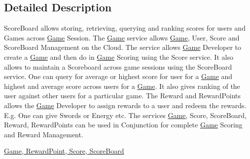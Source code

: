 \subsection{Detailed Description}
Score\+Board allows storing, retrieving, querying and ranking scores for users and Games across \hyperlink{classcom_1_1shephertz_1_1app42_1_1paas_1_1sdk_1_1csharp_1_1game_1_1_game}{Game} Session. The \hyperlink{classcom_1_1shephertz_1_1app42_1_1paas_1_1sdk_1_1csharp_1_1game_1_1_game}{Game} service allows \hyperlink{classcom_1_1shephertz_1_1app42_1_1paas_1_1sdk_1_1csharp_1_1game_1_1_game}{Game}, User, Score and Score\+Board Management on the Cloud. The service allows \hyperlink{classcom_1_1shephertz_1_1app42_1_1paas_1_1sdk_1_1csharp_1_1game_1_1_game}{Game} Developer to create a \hyperlink{classcom_1_1shephertz_1_1app42_1_1paas_1_1sdk_1_1csharp_1_1game_1_1_game}{Game} and then do in \hyperlink{classcom_1_1shephertz_1_1app42_1_1paas_1_1sdk_1_1csharp_1_1game_1_1_game}{Game} Scoring using the Score service. It also allows to maintain a Scoreboard across game sessions using the Score\+Board service. One can query for average or highest score for user for a \hyperlink{classcom_1_1shephertz_1_1app42_1_1paas_1_1sdk_1_1csharp_1_1game_1_1_game}{Game} and highest and average score across users for a \hyperlink{classcom_1_1shephertz_1_1app42_1_1paas_1_1sdk_1_1csharp_1_1game_1_1_game}{Game}. It also gives ranking of the user against other users for a particular game. The Reward and Reward\+Points allows the \hyperlink{classcom_1_1shephertz_1_1app42_1_1paas_1_1sdk_1_1csharp_1_1game_1_1_game}{Game} Developer to assign rewards to a user and redeem the rewards. E.\+g. One can give Swords or Energy etc. The services \hyperlink{classcom_1_1shephertz_1_1app42_1_1paas_1_1sdk_1_1csharp_1_1game_1_1_game}{Game}, Score, Score\+Board, Reward, Reward\+Points can be used in Conjunction for complete \hyperlink{classcom_1_1shephertz_1_1app42_1_1paas_1_1sdk_1_1csharp_1_1game_1_1_game}{Game} Scoring and Reward Management. 

\hyperlink{classcom_1_1shephertz_1_1app42_1_1paas_1_1sdk_1_1csharp_1_1game_1_1_score_board_service}{Game, Reward\+Point, Score, Score\+Board} 


